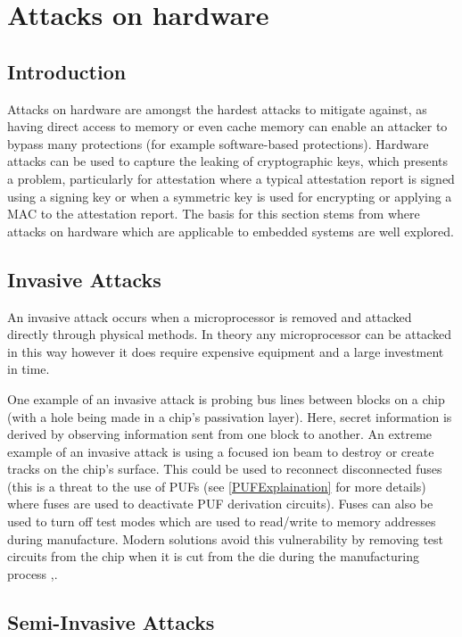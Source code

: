 \section{Attacks on hardware} \label{hardwareAttacks}
\subsection{Introduction}

Attacks on hardware are amongst the hardest attacks to mitigate against, as having direct access to memory or even cache memory can enable an attacker to bypass many protections (for example software-based protections). Hardware attacks can be used to capture the leaking of cryptographic keys, which presents a problem, particularly for attestation where a typical attestation report is signed using a signing key or when a symmetric key is used for encrypting or applying a MAC to the attestation report. The basis for this section stems from \cite{MayesKeithE2008SCTS} where attacks on hardware which are applicable to embedded systems are well explored.

\subsection{Invasive Attacks}
An invasive attack occurs when a microprocessor is removed and attacked directly through physical methods. In theory any microprocessor can be attacked in this way however it does require expensive equipment and a large investment in time.

One example of an invasive attack is probing bus lines between blocks on a chip (with a hole being made in a chip's passivation layer). Here, secret information is derived by observing information sent from one block to another. An extreme example of an invasive attack is using a focused ion beam to destroy or create tracks on the chip's surface. This could be used to reconnect disconnected fuses (this is a threat to the use of PUFs (see \ref{PUFExplaination} for more details) where fuses are used to deactivate PUF derivation circuits). Fuses can also be used to turn off test modes which are used to read\slash write to memory addresses during manufacture. Modern solutions avoid this vulnerability by removing test circuits from the chip when it is cut from the die during the manufacturing process \cite{Anderson1996},\cite{Kommerling1999}.

\subsection{Semi-Invasive Attacks}

